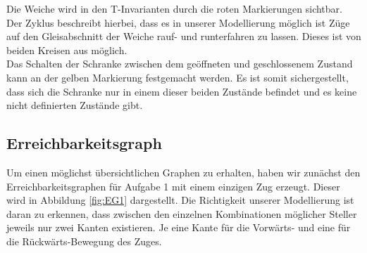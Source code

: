 \documentclass[10pt]{scrartcl}
\begin{document}
Die Weiche wird in den T-Invarianten durch die roten Markierungen sichtbar.
Der Zyklus beschreibt hierbei, dass es in unserer Modellierung möglich ist Züge auf den Gleisabschnitt der Weiche rauf- und runterfahren zu lassen. Dieses ist von beiden Kreisen aus möglich.\\

Das Schalten der Schranke zwischen dem geöffneten und geschlossenem Zustand kann an der gelben Markierung festgemacht werden.
Es ist somit sichergestellt, dass sich die Schranke nur in einem dieser beiden Zustände befindet und es keine nicht definierten Zustände gibt. 

\subsection{Erreichbarkeitsgraph}
Um einen möglichst übersichtlichen Graphen zu erhalten, haben wir zunächst den Erreichbarkeitsgraphen für Aufgabe 1 mit einem einzigen Zug erzeugt. Dieser wird in Abbildung \ref{fig:EG1} dargestellt. Die Richtigkeit unserer Modellierung ist daran zu erkennen, dass zwischen den einzelnen Kombinationen möglicher Steller jeweils nur zwei Kanten existieren. Je eine Kante für die Vorwärts- und eine für die Rückwärts-Bewegung des Zuges.
\end{document}
